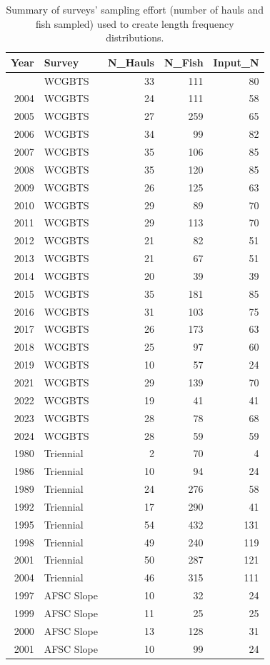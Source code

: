 \documentclass[
]{scrartcl}
\begin{document}
\endgroup

\newpage{}

\begingroup
\fontsize{9.0pt}{10.8pt}\selectfont

\begin{longtable}{rlrrr}

\caption{\label{tbl-survey_length_samples}Summary of surveys' sampling
effort (number of hauls and fish sampled) used to create length
frequency distributions.}

\tabularnewline

\toprule
Year & Survey & N\_Hauls & N\_Fish & Input\_N \\ 
\midrule\addlinespace[2.5pt]
2003 & WCGBTS & 33 & 111 & 80 \\ 
2004 & WCGBTS & 24 & 111 & 58 \\ 
2005 & WCGBTS & 27 & 259 & 65 \\ 
2006 & WCGBTS & 34 & 99 & 82 \\ 
2007 & WCGBTS & 35 & 106 & 85 \\ 
2008 & WCGBTS & 35 & 120 & 85 \\ 
2009 & WCGBTS & 26 & 125 & 63 \\ 
2010 & WCGBTS & 29 & 89 & 70 \\ 
2011 & WCGBTS & 29 & 113 & 70 \\ 
2012 & WCGBTS & 21 & 82 & 51 \\ 
2013 & WCGBTS & 21 & 67 & 51 \\ 
2014 & WCGBTS & 20 & 39 & 39 \\ 
2015 & WCGBTS & 35 & 181 & 85 \\ 
2016 & WCGBTS & 31 & 103 & 75 \\ 
2017 & WCGBTS & 26 & 173 & 63 \\ 
2018 & WCGBTS & 25 & 97 & 60 \\ 
2019 & WCGBTS & 10 & 57 & 24 \\ 
2021 & WCGBTS & 29 & 139 & 70 \\ 
2022 & WCGBTS & 19 & 41 & 41 \\ 
2023 & WCGBTS & 28 & 78 & 68 \\ 
2024 & WCGBTS & 28 & 59 & 59 \\ 
1980 & Triennial & 2 & 70 & 4 \\ 
1986 & Triennial & 10 & 94 & 24 \\ 
1989 & Triennial & 24 & 276 & 58 \\ 
1992 & Triennial & 17 & 290 & 41 \\ 
1995 & Triennial & 54 & 432 & 131 \\ 
1998 & Triennial & 49 & 240 & 119 \\ 
2001 & Triennial & 50 & 287 & 121 \\ 
2004 & Triennial & 46 & 315 & 111 \\ 
1997 & AFSC Slope & 10 & 32 & 24 \\ 
1999 & AFSC Slope & 11 & 25 & 25 \\ 
2000 & AFSC Slope & 13 & 128 & 31 \\ 
2001 & AFSC Slope & 10 & 99 & 24 \\ 
\bottomrule

\end{longtable}
\end{document}
